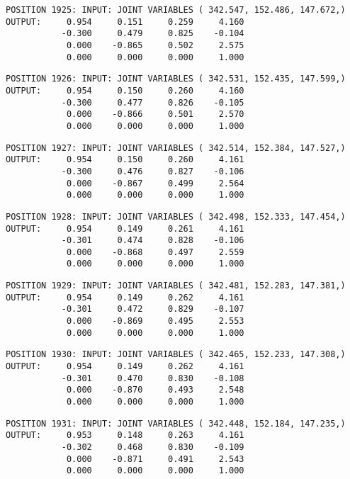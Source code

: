 \begin{verbatim}
POSITION 1925: INPUT: JOINT VARIABLES ( 342.547, 152.486, 147.672,)
OUTPUT:     0.954     0.151     0.259     4.160
           -0.300     0.479     0.825    -0.104
            0.000    -0.865     0.502     2.575
            0.000     0.000     0.000     1.000
\end{verbatim} \pagebreak[1]\begin{verbatim}
POSITION 1926: INPUT: JOINT VARIABLES ( 342.531, 152.435, 147.599,)
OUTPUT:     0.954     0.150     0.260     4.160
           -0.300     0.477     0.826    -0.105
            0.000    -0.866     0.501     2.570
            0.000     0.000     0.000     1.000
\end{verbatim} \pagebreak[1]\begin{verbatim}
POSITION 1927: INPUT: JOINT VARIABLES ( 342.514, 152.384, 147.527,)
OUTPUT:     0.954     0.150     0.260     4.161
           -0.300     0.476     0.827    -0.106
            0.000    -0.867     0.499     2.564
            0.000     0.000     0.000     1.000
\end{verbatim} \pagebreak[1]\begin{verbatim}
POSITION 1928: INPUT: JOINT VARIABLES ( 342.498, 152.333, 147.454,)
OUTPUT:     0.954     0.149     0.261     4.161
           -0.301     0.474     0.828    -0.106
            0.000    -0.868     0.497     2.559
            0.000     0.000     0.000     1.000
\end{verbatim} \pagebreak[1]\begin{verbatim}
POSITION 1929: INPUT: JOINT VARIABLES ( 342.481, 152.283, 147.381,)
OUTPUT:     0.954     0.149     0.262     4.161
           -0.301     0.472     0.829    -0.107
            0.000    -0.869     0.495     2.553
            0.000     0.000     0.000     1.000
\end{verbatim} \pagebreak[1]\begin{verbatim}
POSITION 1930: INPUT: JOINT VARIABLES ( 342.465, 152.233, 147.308,)
OUTPUT:     0.954     0.149     0.262     4.161
           -0.301     0.470     0.830    -0.108
            0.000    -0.870     0.493     2.548
            0.000     0.000     0.000     1.000
\end{verbatim} \pagebreak[1]\begin{verbatim}
POSITION 1931: INPUT: JOINT VARIABLES ( 342.448, 152.184, 147.235,)
OUTPUT:     0.953     0.148     0.263     4.161
           -0.302     0.468     0.830    -0.109
            0.000    -0.871     0.491     2.543
            0.000     0.000     0.000     1.000
\end{verbatim} \pagebreak[1]\begin{verbatim}

\end{verbatim}
